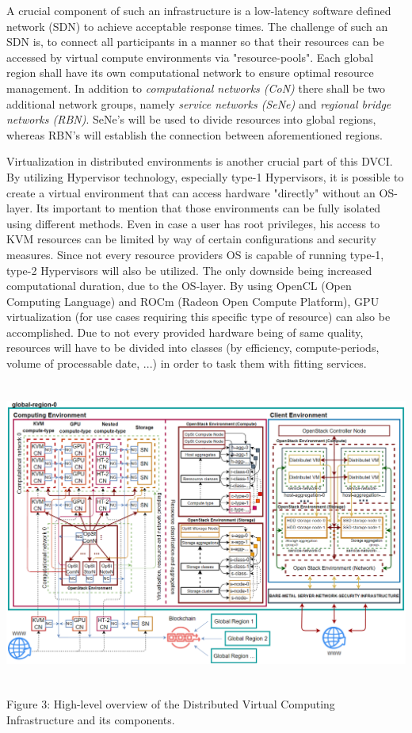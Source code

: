 \documentclass[]{article}
\begin{document}
A crucial component of such an infrastructure is a low-latency software defined network (SDN) to achieve acceptable response times.
The challenge of such an SDN is, to connect all participants in a manner so that their resources can be accessed by virtual compute environments via "resource-pools".
Each global region shall have its own computational network to ensure optimal resource management.
In addition to \textit{computational networks (CoN)} there shall be two additional network groups, namely \textit{service networks (SeNe)} and \textit{regional bridge networks (RBN)}.
SeNe's will be used to divide resources into global regions, whereas RBN's will establish the connection between aforementioned regions.

Virtualization in distributed environments is another crucial part of this DVCI.
By utilizing Hypervisor technology, especially type-1 Hypervisors, it is possible to create a virtual environment that can access hardware "directly" without an OS-layer.
Its important to mention that those environments can be fully isolated using different methods.
Even in case a user has root privileges, his access to KVM resources can be limited by way of certain configurations and security measures.
Since not every resource providers OS is capable of running type-1, type-2 Hypervisors will also be utilized.
The only downside being increased computational duration, due to the OS-layer.
By using OpenCL (Open Computing Language) and ROCm (Radeon Open Compute Platform), GPU virtualization (for use cases requiring this specific type of resource) can also be accomplished.
Due to not every provided hardware being of same quality, resources will have to be divided into classes (by efficiency, compute-periods, volume of processable date, ...) in order to task them with fitting services.

\begin{center}
	\includegraphics[height=10cm]{dvci-arch-overview}
\end{center}
\begin{center}
	Figure 3: High-level overview of the Distributed Virtual Computing Infrastructure and its components.
\end{center}
\end{document}
